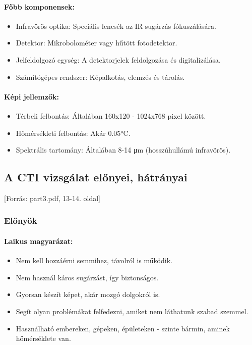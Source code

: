 \documentclass[a4paper,12pt]{article}
\begin{document}
\paragraph{Főbb komponensek:} \begin{itemize} \item Infravörös optika: Speciális lencsék az IR sugárzás fókuszálására. \item Detektor: Mikrobolométer vagy hűtött fotodetektor. \item Jelfeldolgozó egység: A detektorjelek feldolgozása és digitalizálása. \item Számítógépes rendszer: Képalkotás, elemzés és tárolás. \end{itemize}

\paragraph{Képi jellemzők:} \begin{itemize} \item Térbeli felbontás: Általában 160x120 - 1024x768 pixel között. \item Hőmérsékleti felbontás: Akár 0.05°C. \item Spektrális tartomány: Általában 8-14 μm (hosszúhullámú infravörös). \end{itemize}

\subsection{A CTI vizsgálat előnyei, hátrányai} [Forrás: part3.pdf, 13-14. oldal]

\subsubsection{Előnyök}

\paragraph{Laikus magyarázat:} \begin{itemize} \item Nem kell hozzáérni semmihez, távolról is működik. \item Nem használ káros sugárzást, így biztonságos. \item Gyorsan készít képet, akár mozgó dolgokról is. \item Segít olyan problémákat felfedezni, amiket nem láthatunk szabad szemmel. \item Használható embereken, gépeken, épületeken - szinte bármin, aminek hőmérséklete van. \end{itemize}
\end{document}
